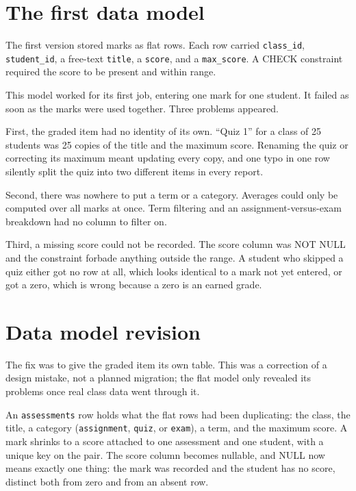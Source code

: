 \documentclass[11pt,a4paper]{article}
\begin{document}
\section{The first data model}
\label{sec:v1}

The first version stored marks as flat rows. Each row carried \texttt{class\_id}, \texttt{student\_id}, a free-text \texttt{title}, a \texttt{score}, and a \texttt{max\_score}. A CHECK constraint required the score to be present and within range.

This model worked for its first job, entering one mark for one student. It failed as soon as the marks were used together. Three problems appeared.

First, the graded item had no identity of its own. ``Quiz 1'' for a class of 25 students was 25 copies of the title and the maximum score. Renaming the quiz or correcting its maximum meant updating every copy, and one typo in one row silently split the quiz into two different items in every report.

Second, there was nowhere to put a term or a category. Averages could only be computed over all marks at once. Term filtering and an assignment-versus-exam breakdown had no column to filter on.

Third, a missing score could not be recorded. The score column was NOT NULL and the constraint forbade anything outside the range. A student who skipped a quiz either got no row at all, which looks identical to a mark not yet entered, or got a zero, which is wrong because a zero is an earned grade.

\section{Data model revision}
\label{sec:v2}

The fix was to give the graded item its own table. This was a correction of a design mistake, not a planned migration; the flat model only revealed its problems once real class data went through it.

An \texttt{assessments} row holds what the flat rows had been duplicating: the class, the title, a category (\texttt{assignment}, \texttt{quiz}, or \texttt{exam}), a term, and the maximum score. A mark shrinks to a score attached to one assessment and one student, with a unique key on the pair. The score column becomes nullable, and NULL now means exactly one thing: the mark was recorded and the student has no score, distinct both from zero and from an absent row.
\end{document}
